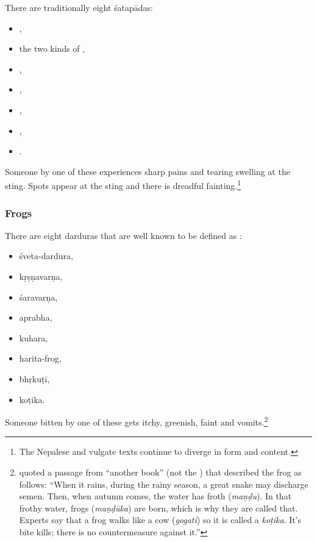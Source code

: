 \begin{translation}
\item[30, verses 1, 2]

There are traditionally eight  \glspl{śatapāda}:
\begin{itemize}
    \item {},
    \item the two kinds of ,
    \item {},
    \item {},
    \item {},
    \item {},
    \item {}.
\end{itemize}
Someone  by one of these experiences sharp pains and
tearing swelling at the sting.  Spots appear at the sting and there is
dreadful fainting.\footnote{The Nepalese and vulgate texts continue to
    diverge in form and content.}


\subsubsection{Frogs}

\item[31, verses 1, 2]

There are eight \glspl{dardura} that are well known to be defined as
:
\begin{itemize}
    \item \Gls{śveta-dardura},
    \item \Gls{kṛṣṇavarṇa},
    \item \Gls{śaravarṇa},
    \item \Gls{aprabha},
    \item \Gls{kuhara},
    \item \Gls{harita-frog},
    \item \Gls{bhṛkuṭī},
    \item \Gls{koṭika}.
\end{itemize}
Someone bitten by one of these gets itchy, greenish, faint and
vomits.\footnote{ quoted a passage from “another
    book” (not the \CS) that described the  frog as follows: “When
    it rains, during the rainy season, a great snake may discharge semen. 
    Then, when autumn comes, the water has froth (\emph{maṇḍu}).  In that
    frothy water, frogs (\emph{maṇḍūka}) are born, which is why they are
    called that.  Experts say that a frog walks like a cow (\emph{gogati})
    so it is called a \emph{koṭika}.  It's bite kills; there is no
    countermeasure against it.”}


\end{translation}
